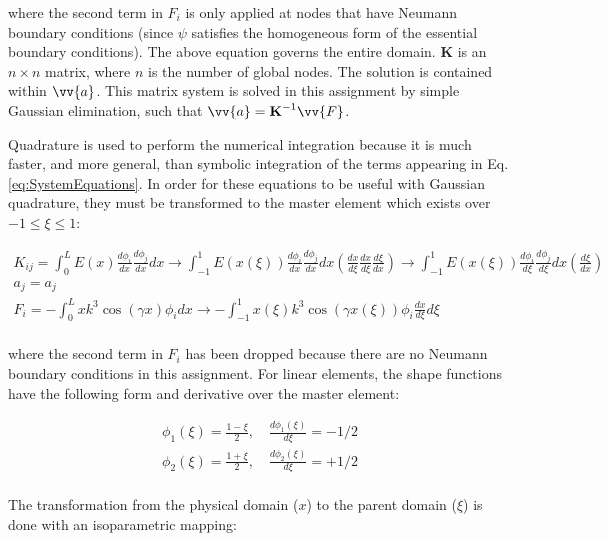 \documentclass[10pt]{article}
\begin{document}
where the second term in \(F_i\) is only applied at nodes that have Neumann boundary conditions (since \(\psi\) satisfies the homogeneous form of the essential boundary conditions). The above equation governs the entire domain. \(\textbf{K}\) is an \(n \times n\) matrix, where \(n\) is the number of global nodes. The solution is contained within \(\vv{a}\). This matrix system is solved in this assignment by simple Gaussian elimination, such that \(\vv{a}=\textbf{K}^{-1}\vv{F}\).

Quadrature is used to perform the numerical integration because it is much faster, and more general, than symbolic integration of the terms appearing in Eq. \eqref{eq:SystemEquations}. In order for these equations to be useful with Gaussian quadrature, they must be transformed to the master element which exists over \(-1\leq\xi\leq1\):

\begin{equation}
\label{eq:GoverningEqnsIsoparametric}
\begin{aligned}
K_{ij}=\int_{0}^{L}E(x)\frac{d\phi_i}{dx}\frac{d\phi_j}{dx}dx\rightarrow\int_{-1}^{1}E(x(\xi))\frac{d\phi_i}{dx}\frac{d\phi_j}{dx}dx\left(\frac{dx}{d\xi}\frac{dx}{d\xi}\frac{d\xi}{dx}\right)\rightarrow\int_{-1}^{1}E(x(\xi))\frac{d\phi_i}{d\xi}\frac{d\phi_j}{d\xi}dx\left(\frac{d\xi}{dx}\right)\\
a_j=a_j\\
F_i=-\int_{0}^{L}xk^3\cos{(\gamma x)}\phi_idx\rightarrow-\int_{-1}^{1}x(\xi)k^3\cos{(\gamma x(\xi))}\phi_i\frac{dx}{d\xi}d\xi\\
\end{aligned}
\end{equation} 

where the second term in \(F_i\) has been dropped because there are no Neumann boundary conditions in this assignment. For linear elements, the shape functions have the following form and derivative over the master element:

\begin{equation}
\begin{aligned}
\phi_1(\xi)=\frac{1-\xi}{2},\quad\frac{d\phi_1(\xi)}{d\xi}=-1/2\\
\phi_2(\xi)=\frac{1+\xi}{2}, \quad\frac{d\phi_2(\xi)}{d\xi}=+1/2\\
\end{aligned}
\end{equation}

The transformation from the physical domain (\(x\)) to the parent domain (\(\xi\)) is done with an isoparametric mapping:
\end{document}
